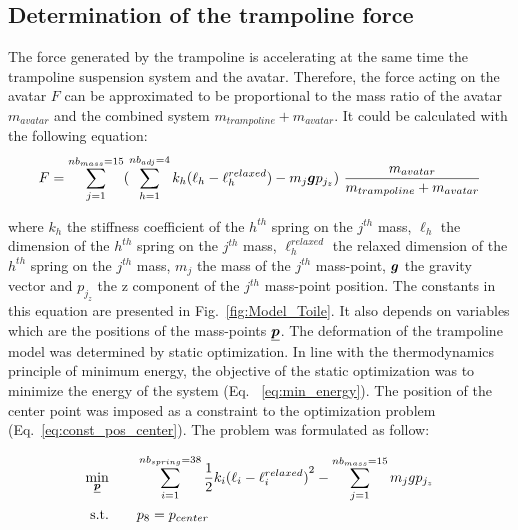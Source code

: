 \subsection{Determination of the trampoline force}\label{subsec:2c}

The force generated by the trampoline is accelerating at the same time the trampoline suspension system and the avatar.
Therefore, the force acting on the avatar $F$ can be approximated to be proportional to the mass ratio of the avatar $m_{avatar}$ and the combined system $m_{trampoline} + m_{avatar}$.
It could be calculated with the following equation:
\[
F = \sum_{j=1}^{nb_{mass}=15} ( \sum_{h=1}^{nb_{adj}=4} k_h {(\ell_h - {\ell}^{relaxed}_h)} - m_j \bm{g}p_{j_z}) ~ \frac{m_{avatar}}{m_{trampoline} + m_{avatar} }  \label{eq:Force_trampo}
\]

\noindent where ${k_h}$ the stiffness coefficient of the $h^{th}$ spring on the $j^{th}$ mass, $\ell_h$ the dimension of the $h^{th}$ spring on the $j^{th}$ mass, ${\ell}^{relaxed}_h$ the relaxed dimension of the $h^{th}$ spring on the $j^{th}$ mass, $m_j$ the mass of the $j^{th}$ mass-point,  $\bm{g}$ the gravity vector and $p_{j_z}$ the z component of the $j^{th}$ mass-point position.
The constants in this equation are presented in Fig.~\ref{fig:Model_Toile}.
It also depends on variables which are the positions of the mass-points $\underline{\bm{p}}$.
The deformation of the trampoline model was determined by static optimization.
In line with the thermodynamics principle of minimum energy, the objective of the static optimization was to minimize the energy of the system (Eq. ~\ref{eq:min_energy}).
The position of the center point was imposed as a constraint to the optimization problem (Eq.~\ref{eq:const_pos_center}).
The problem was formulated as follow:  

\begin{subequations}
\begin{align}
 \underset{\substack{\underline{\bm{p}}}}{\min} \hspace{2em} & \sum_{i=1}^{nb_{spring}=38} \dfrac{1}{2} k_i {(\ell_i - {\ell}^{relaxed}_i)}^{2} - \sum_{j=1}^{nb_{mass}=15} m_j g p_{j_z} \label{eq:min_energy} \\ 
   \text{s.t.}  \hspace{2em}  & p_{8} = p_{center} \label{eq:const_pos_center}
\end{align}
\end{subequations}

